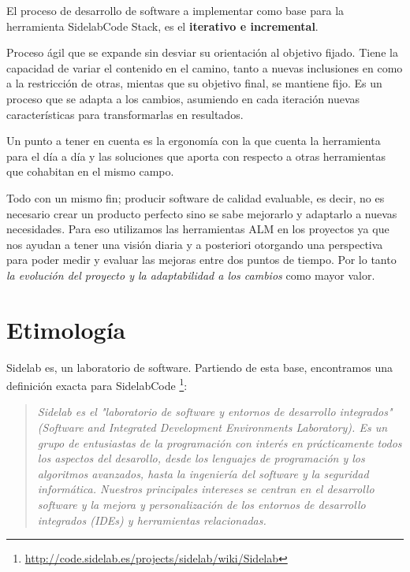 \par El proceso de desarrollo de software a implementar como base para la herramienta SidelabCode Stack, es el \textbf{iterativo e incremental}.

\par Proceso ágil que se expande sin desviar su orientación al objetivo fijado. Tiene la capacidad de variar el contenido en el camino, tanto a nuevas inclusiones en como a la restricción de otras, mientas que su objetivo final, se mantiene fijo. Es un proceso que se adapta a los cambios, asumiendo en cada iteración nuevas características para transformarlas en resultados.

\par Un punto a tener en cuenta es la ergonom\'ia con la que cuenta la herramienta para el d\'ia a d\'ia y las soluciones que aporta con respecto a otras herramientas que cohabitan en el mismo campo.

\par Todo con un mismo fin; producir software de calidad evaluable, es decir, no es necesario crear un producto perfecto sino se sabe mejorarlo y adaptarlo a nuevas necesidades. Para eso utilizamos las herramientas ALM en los proyectos ya que nos ayudan a tener una visi\'on diaria y a posteriori otorgando una perspectiva para poder medir y evaluar las mejoras entre dos puntos de tiempo. Por lo tanto \emph{la evoluci\'on del proyecto y la adaptabilidad a los cambios} como mayor valor.

\section{Etimolog\'ia}
\label{sec:etimologia}

\par Sidelab es, un laboratorio de software. Partiendo de esta base, encontramos una definici\'on exacta para SidelabCode \footnote{\url{http://code.sidelab.es/projects/sidelab/wiki/Sidelab}}:

\begin{quotation}
        \emph{Sidelab es el "laboratorio de software y entornos de desarrollo integrados" (Software and Integrated Development Environments Laboratory). Es un grupo de entusiastas de la programaci\'on con inter\'es en pr\'acticamente todos los aspectos del desarollo, desde los lenguajes de programaci\'on y los algoritmos avanzados, hasta la ingenier\'ia del software y la seguridad inform\'atica. Nuestros principales intereses se centran en el desarrollo software y la mejora y personalizaci\'on de los entornos de desarrollo integrados (IDEs) y herramientas relacionadas.}
\end{quotation}

